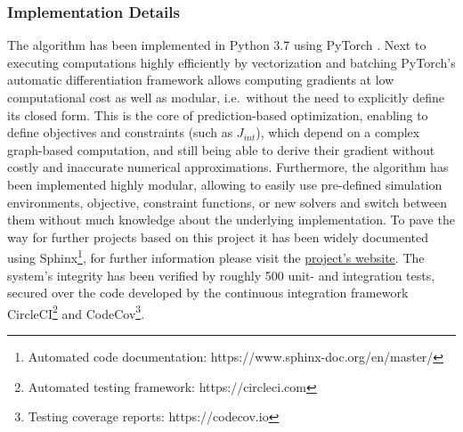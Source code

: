 
\subsubsection{Implementation Details} 
The algorithm has been implemented in Python 3.7 using PyTorch \cite{pytorch}. Next to executing computations highly efficiently by vectorization and batching PyTorch's automatic differentiation framework allows computing gradients at low computational cost as well as modular, i.e.\ without the need to explicitly define its closed form. This is the core of prediction-based optimization, enabling to define objectives and constraints (such as $J_{int}$), which depend on a complex graph-based computation, and still being able to derive their gradient without costly and inaccurate numerical approximations. 
\newline 
Furthermore, the algorithm has been implemented highly modular, allowing to easily use pre-defined simulation environments, objective, constraint functions, or new solvers and switch between them without much knowledge about the underlying implementation. To pave the way for further projects based on this project it has been widely documented using Sphinx\footnote{Automated code documentation: https://www.sphinx-doc.org/en/master/}, for further information please visit the \href{https://simon-schaefer.github.io/mantrap/}{project's website}.  
\newline
The system's integrity has been verified by roughly 500 unit- and integration tests, secured over the code developed by the continuous integration framework CircleCI\footnote{Automated testing framework: https://circleci.com} and CodeCov\footnote{Testing coverage reports: https://codecov.io}.

